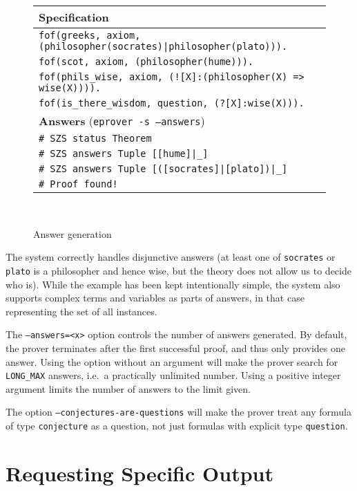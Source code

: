 \documentclass{report}
\begin{document}
\begin{figure}
  \centering
\begin{tabular}{p{}}
  \hline
  \textbf{Specification}\\
  \hline
  \verb+fof(greeks, axiom, (philosopher(socrates)|philosopher(plato))).+\\
  \verb|fof(scot, axiom, (philosopher(hume))).|\\
  \verb|fof(phils_wise, axiom, (![X]:(philosopher(X) => wise(X)))).|\\
  \verb|fof(is_there_wisdom, question, (?[X]:wise(X))).|\\
  \hline
  \textbf{Answers} (\texttt{eprover -s --answers})\\
  \hline
  \verb|# SZS status Theorem|\\
  \verb+# SZS answers Tuple [[hume]|_]+\\
  \verb+# SZS answers Tuple [([socrates]|[plato])|_]+\\
  \verb|# Proof found!|\\
  \hline
\end{tabular}\\

  \caption{Answer generation}
  \label{fig:answers}
\end{figure}

The system correctly handles disjunctive answers (at least one of
\texttt{socrates} or \texttt{plato} is a philosopher and hence wise,
but the theory does not allow us to decide who is). While the example
has been kept intentionally simple, the system also supports complex
terms and variables as parts of answers, in that case representing the
set of all instances.

The \texttt{--answers=<x>} option controls the number of answers
generated. By default, the prover terminates after the first
successful proof, and thus only provides one answer. Using the option
without an argument will make the prover search for \texttt{LONG\_MAX}
answers, i.e.\ a practically unlimited number. Using a positive integer
argument limits the number of answers to the limit given.

The option \texttt{--conjectures-are-questions} will make the prover
treat any formula of type \texttt{conjecture} as a question, not just
formulas with explicit type \texttt{question}.




\section{Requesting Specific Output}
\label{sec:output:results}
\end{document}

